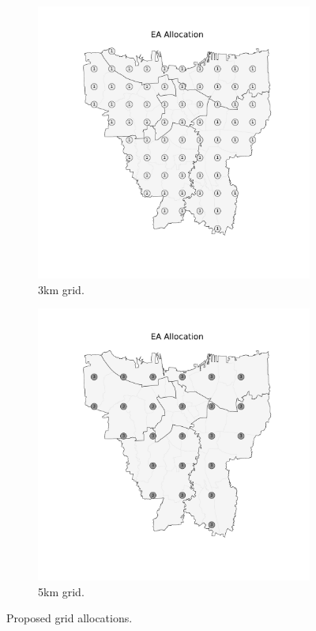 \documentclass[preprint,12pt]{elsarticle}
\begin{document}
\begin{figure}
\begin{center}
\begin{subfigure}{0.48\textwidth}
\includegraphics[width=\textwidth]{img/map_grid3km_proposed}
\caption{3km grid.}
\end{subfigure}
\hfill
\begin{subfigure}{0.48\textwidth}
\includegraphics[width=\textwidth]{img/map_grid5km_proposed}
\caption{5km grid.}
\end{subfigure}
\caption{Proposed grid allocations.}
\label{fig:grid_allocations}
\end{center}
\end{figure}
\end{document}

